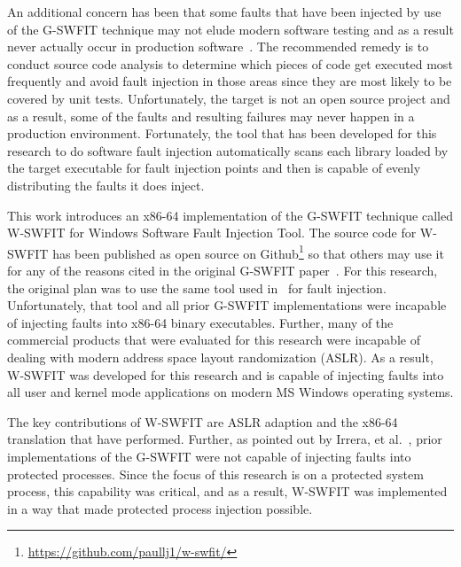 An additional concern has been that some faults that have been injected by use
of the G-SWFIT technique may not elude modern software testing and as a result
never actually occur in production software~\cite{natella2010}.  The
recommended remedy is to conduct source code analysis to determine which
pieces of code get executed most frequently and avoid fault injection in those
areas since they are most likely to be covered by unit tests.  Unfortunately,
the target is not an open source project and as a result, some of the faults
and resulting failures may never happen in a production environment.
Fortunately, the tool that has been developed for this research to do software
fault injection automatically scans each library loaded by the target
executable for fault injection points and then is capable of evenly
distributing the faults it does inject.

This work introduces an x86-64 implementation of the G-SWFIT technique called
W-SWFIT for Windows Software Fault Injection Tool.  The source code for W-SWFIT
has been published as open source on
Github\footnote{\url{https://github.com/paullj1/w-swfit/}} so that others may
use it for any of the reasons cited in the original G-SWFIT
paper~\cite{gswfit}.  For this research, the original plan was to use the same
tool used in~\cite{irrera2015} for fault injection.  Unfortunately, that tool
and all prior G-SWFIT implementations were incapable of injecting faults into
x86-64 binary executables.  Further, many of the commercial products that were
evaluated for this research were incapable of dealing with modern address space
layout randomization (ASLR).  As a result, W-SWFIT was developed for this
research and is capable of injecting faults into all user and kernel mode
applications on modern MS Windows operating systems.  

The key contributions of W-SWFIT are ASLR adaption and the x86-64 translation
that have performed.  Further, as pointed out by Irrera, et
al.~\cite{irrera2013a}, prior implementations of the G-SWFIT were not capable
of injecting faults into protected processes.  Since the focus of this research
is on a protected system process, this capability was critical, and as a result,
W-SWFIT was implemented in a way that made protected process injection
possible.  

